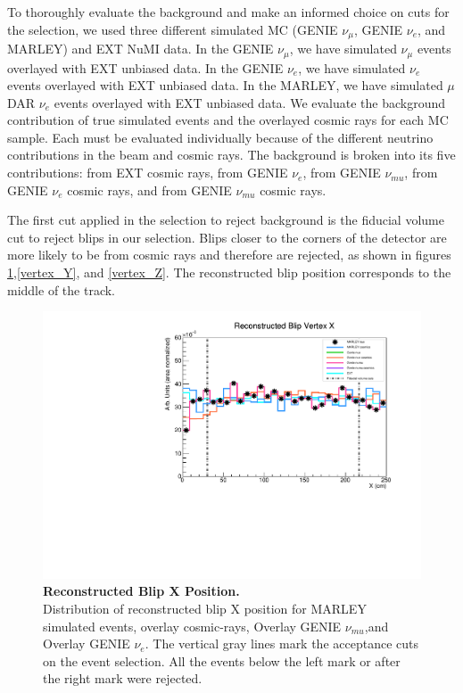 To thoroughly evaluate the background and make an informed choice on cuts for the selection, we used three different simulated MC (GENIE $\nu_{\mu}$, GENIE $\nu_{e}$, and MARLEY) and EXT NuMI data. In the GENIE $\nu_{\mu}$, we have simulated $\nu_{\mu}$ events overlayed with EXT unbiased data. In the GENIE $\nu_{e}$, we have simulated $\nu_{e}$ events overlayed with EXT unbiased data. In the MARLEY, we have simulated $\mu$DAR $\nu_e$ events overlayed with EXT unbiased data. We evaluate the background contribution of true simulated events and the overlayed cosmic rays for each MC sample. Each must be evaluated individually because of the different neutrino contributions in the beam and cosmic rays. The background is broken into its five contributions: from EXT cosmic rays, from GENIE $\nu_{e}$, from GENIE $\nu_{mu}$, from GENIE $\nu_{e}$ cosmic rays, and from GENIE $\nu_{mu}$ cosmic rays. 

The first cut applied in the selection to reject background is the fiducial volume cut to reject blips in our selection. Blips closer to the corners of the detector are more likely to be from cosmic rays and therefore are rejected, as shown in figures \ref{vertex_X},\ref{vertex_Y}, and \ref{vertex_Z}. The reconstructed blip position corresponds to the middle of the track. 

\begin{figure}[h!]
    \centering
    \includegraphics[width=120mm]{Figures/vertex_X.pdf}
    \caption[Reconstructed Blip X Position.]{{\textbf{Reconstructed Blip X Position.}}\\ Distribution of reconstructed blip X position for MARLEY simulated events, overlay cosmic-rays, Overlay GENIE $\nu_{mu}$,and Overlay GENIE $\nu_{e}$. The vertical gray lines mark the acceptance cuts on the event selection. All the events below the left mark or after the right mark were rejected.}
    \label{vertex_X}
\end{figure}

